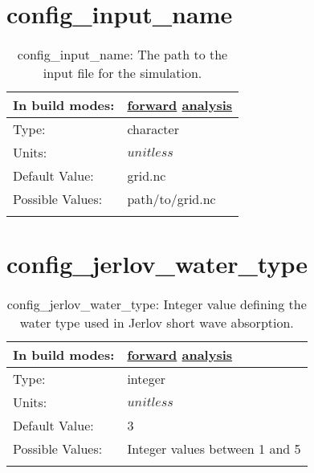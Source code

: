 \section[config\_input\_name]{config\_input\_name}
\label{sec:nm_sec_config_input_name}
\begin{center}
\begin{longtable}{| p{2.0in} || p{4.0in} |}
    \hline
    In build modes: & \hyperref[subsec:forward_nm_tab_io]{forward} \hyperref[subsec:analysis_nm_tab_io]{analysis} \\
    \hline
    Type: & character \\
    \hline
    Units: & $unitless$ \\
    \hline
    Default Value: & grid.nc \\
    \hline
    Possible Values: & path/to/grid.nc \\
    \hline
    \caption{config\_input\_name: The path to the input file for the simulation.}
\end{longtable}
\end{center}
\section[config\_jerlov\_water\_type]{config\_jerlov\_water\_type}
\label{sec:nm_sec_config_jerlov_water_type}
\begin{center}
\begin{longtable}{| p{2.0in} || p{4.0in} |}
    \hline
    In build modes: & \hyperref[subsec:forward_nm_tab_forcing]{forward} \hyperref[subsec:analysis_nm_tab_forcing]{analysis} \\
    \hline
    Type: & integer \\
    \hline
    Units: & $unitless$ \\
    \hline
    Default Value: & 3 \\
    \hline
    Possible Values: & Integer values between 1 and 5 \\
    \hline
    \caption{config\_jerlov\_water\_type: Integer value defining the water type used in Jerlov short wave absorption.}
\end{longtable}
\end{center}
